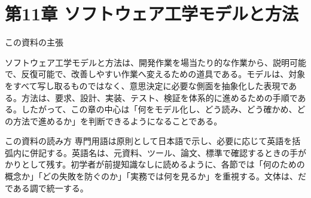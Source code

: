 \section{第11章 ソフトウェア工学モデルと方法}
\noindent この資料の主張\par
ソフトウェア工学モデルと方法は、開発作業を場当たり的な作業から、説明可能で、反復可能で、改善しやすい作業へ変えるための道具である。モデルは、対象をすべて写し取るものではなく、意思決定に必要な側面を抽象化した表現である。方法は、要求、設計、実装、テスト、検証を体系的に進めるための手順である。したがって、この章の中心は「何をモデル化し、どう読み、どう確かめ、どの方法で進めるか」を判断できるようになることである。

\begin{pointbox}{この資料の読み方}
専門用語は原則として日本語で示し、必要に応じて英語を括弧内に併記する。英語名は、元資料、ツール、論文、標準で確認するときの手がかりとして残す。初学者が前提知識なしに読めるように、各節では「何のための概念か」「どの失敗を防ぐのか」「実務では何を見るか」を重視する。文体は、だである調で統一する。
\end{pointbox}

